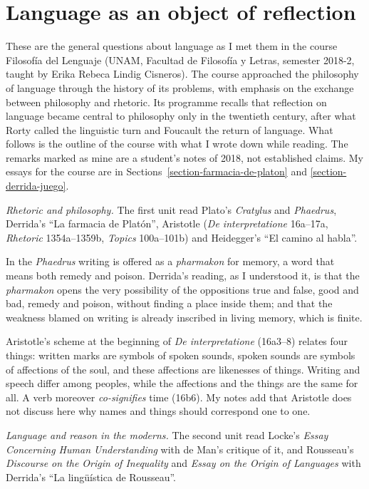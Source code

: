 \section{Language as an object of reflection}
\label{section-language}

These are the general questions about
language as I met them in the course
Filosofía del Lenguaje (UNAM, Facultad de
Filosofía y Letras, semester 2018-2, taught
by Erika Rebeca Lindig Cisneros). The course
approached the philosophy of language
through the history of its problems, with
emphasis on the exchange between philosophy
and rhetoric. Its programme recalls that
reflection on language became central to
philosophy only in the twentieth century,
after what Rorty called the linguistic turn
and Foucault the return of language. What
follows is the outline of the course with
what I wrote down while reading. The remarks
marked as mine are a student's notes of
2018, not established claims. My essays for
the course are in
Sections~\ref{section-farmacia-de-platon}
and \ref{section-derrida-juego}.

\medskip\noindent
\emph{Rhetoric and philosophy.}
The first unit read Plato's \emph{Cratylus}
and \emph{Phaedrus}, Derrida's ``La farmacia
de Platón'', Aristotle (\emph{De
interpretatione} 16a--17a, \emph{Rhetoric}
1354a--1359b, \emph{Topics} 100a--101b) and
Heidegger's ``El camino al habla''.

In the \emph{Phaedrus} writing is offered as
a \emph{pharmakon} for memory, a word that
means both remedy and poison. Derrida's
reading, as I understood it, is that the
\emph{pharmakon} opens the very possibility
of the oppositions true and false, good and
bad, remedy and poison, without finding a
place inside them; and that the weakness
blamed on writing is already inscribed in
living memory, which is finite.

Aristotle's scheme at the beginning of
\emph{De interpretatione} (16a3--8) relates
four things: written marks are symbols of
spoken sounds, spoken sounds are symbols of
affections of the soul, and these affections
are likenesses of things. Writing and speech
differ among peoples, while the affections
and the things are the same for all. A verb
moreover \emph{co-signifies} time (16b6). My
notes add that Aristotle does not discuss
here why names and things should correspond
one to one.

\medskip\noindent
\emph{Language and reason in the moderns.}
The second unit read Locke's \emph{Essay
Concerning Human Understanding} with de
Man's critique of it, and Rousseau's
\emph{Discourse on the Origin of Inequality}
and \emph{Essay on the Origin of Languages}
with Derrida's ``La lingüística de
Rousseau''.

